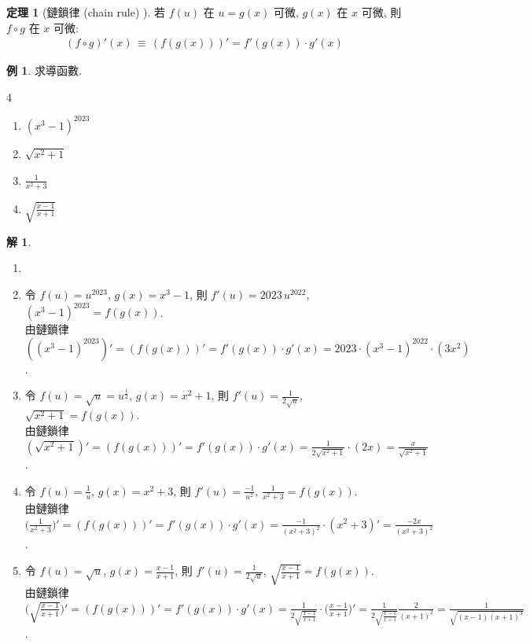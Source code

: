\documentclass[12pt]{extarticle}
\newcommand{\ds}{\displaystyle}
\theoremstyle{definition}
\newtheorem*{thm}{定理}
\newtheorem*{ex}{例}
\newtheorem*{sol}{解}
\begin{document}
\begin{thm}[鏈鎖律 (chain rule) ]
  若 $f(u)$ 在 $u = g(x)$ 可微, $g(x)$ 在 $x$ 可微, 則 $f\circ g$ 在 $x$ 可微: 
  \begin{align*}
    (f\circ g)'(x)\,\equiv\,(f(g(x)))' = f'(g(x))\cdot g'(x)
  \end{align*}
\end{thm}

\begin{ex} 求導函數.
  \begin{multicols}{4}
    \begin{enumerate}\setlength\itemsep{0em}
      \item $(x^3 - 1)^{2023}$
      \item $\sqrt{x^2 + 1}$
      \item $\frac{1}{x^2 + 3}$
      \item $\sqrt{\frac{x - 1}{x + 1}}$
    \end{enumerate}
  \end{multicols}
\end{ex}

\begin{sol}
  \begin{enumerate}\setlength\itemsep{0em}
    \item[]
    \item 令 $\ds f(u) = u^{2023}$, $g(x) = x^3 - 1$, 則 $\ds f'(u) = 2023\,u^{2022}$, $\ds(x^3 - 1)^{2023} = f(g(x))$. \\由鏈鎖律 $\ds((x^3 - 1)^{2023})' = (f(g(x)))' = f'(g(x))\cdot g'(x) = 2023\cdot(x^3 - 1)^{2022}\cdot(3x^2)$. 
    \item 令 $\ds f(u) = \sqrt{u} = u^{\frac{1}{2}}$, $g(x) = x^2 + 1$, 則 $\ds f'(u) = \frac{1}{2\sqrt{u}}$, $\ds\sqrt{x^2 + 1} = f(g(x))$. \\由鏈鎖律 $\ds (\sqrt{x^2 + 1})' = (f(g(x)))' = f'(g(x))\cdot g'(x) = \frac{1}{2\sqrt{x^2 + 1}}\cdot(2x) = \frac{x}{\sqrt{x^2 + 1}}$. 
    \item 令 $\ds f(u) = \frac{1}{u}$, $g(x) = x^2 + 3$, 則 $\ds f'(u) = \frac{-1}{u^2}$, $\ds\frac{1}{x^2 + 3} = f(g(x))$. \\由鏈鎖律 $\ds\Big(\frac{1}{x^2 + 3}\Big)' = (f(g(x)))' = f'(g(x))\cdot g'(x) = \frac{-1}{(x^2 + 3)^2}\cdot(x^2 + 3)' = \frac{-2x}{(x^2 + 3)^2}$. 
    \item 令 $\ds f(u) = \sqrt{u}$, $\ds g(x) = \frac{x - 1}{x + 1}$, 則 $\ds f'(u) = \frac{1}{2\sqrt{u}}$, $\ds\sqrt{\frac{x - 1}{x + 1}} = f(g(x))$. \\由鏈鎖律 $\ds\bigg(\sqrt{\frac{x - 1}{x + 1}}\bigg)' = (f(g(x)))' = f'(g(x))\cdot g'(x) = \frac{1}{2\sqrt{\frac{x - 1}{x + 1}}}\cdot\Big(\frac{x - 1}{x + 1}\Big)' = \frac{1}{2\sqrt{\frac{x - 1}{x + 1}}}\frac{2}{(x + 1)^2} = \frac{1}{\sqrt{(x - 1)(x + 1)^3}}$. 
  \end{enumerate}
\end{sol}
\end{document}
